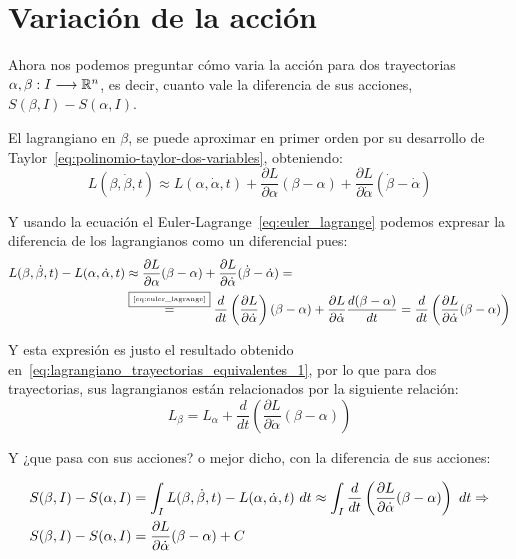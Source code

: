\section{Variación de la acción}
Ahora nos podemos preguntar cómo varia la acción para dos trayectorias $\alpha,\beta:I\longrightarrow \mathbb{R}^n$, es decir, cuanto vale la diferencia de sus acciones, $S(\beta, I)-S(\alpha, I)$.

El lagrangiano en $\beta$, se puede aproximar en primer orden por su desarrollo de Taylor~\ref{eq:polinomio-taylor-dos-variables}, obteniendo:
\begin{equation*}
    L(\beta, \dot{\beta}, t)\approx L(\alpha, \dot{\alpha}, t)+\frac{\partial L}{\partial\alpha}(\beta-\alpha)+\frac{\partial L}{\partial\dot{\alpha}}(\dot{\beta}-\dot{\alpha})
\end{equation*}

Y usando la ecuación el Euler-Lagrange~\ref{eq:euler_lagrange} podemos expresar la diferencia de los lagrangianos como un diferencial pues:
\begin{equation}
    \label{variacion-lagrange}
    \begin{align}
        L(\beta, \dot{\beta}, t)- L(\alpha, \dot{\alpha}, t) & \approx\frac{\partial L}{\partial\alpha}(\beta-\alpha)+\frac{\partial L}{\partial\dot{\alpha}}(\dot{\beta}-\dot{\alpha})=\\
        & \overset{\fbox{\tiny \ref{eq:euler_lagrange}}}{=}\frac{d}{dt}\left(\frac{\partial L}{\partial\dot{\alpha}}\right)(\beta-\alpha)+\frac{\partial L}{\partial\dot{\alpha}}\frac{d(\beta-\alpha)}{dt} =\frac{d}{dt}\left(\frac{\partial L}{\partial\dot{\alpha}}(\beta-\alpha)\right)
    \end{align}
\end{equation}

Y esta expresión es justo el resultado obtenido en~\ref{eq:lagrangiano_trayectorias_equivalentes_1}, por lo que para dos trayectorias, sus lagrangianos están relacionados por la siguiente relación:
\begin{equation}
    \label{eq:lagrangianos_relacionados}
    L_\beta=L_\alpha+\frac{d}{dt}\left(\frac{\partial L}{\partial\dot{\alpha}}(\beta-\alpha)\right)
\end{equation}

Y ¿que pasa con sus acciones? o mejor dicho, con la diferencia de sus acciones:

\begin{equation}
    \label{eq:variacion-accion}
    \begin{align}
        S(\beta, I)-S(\alpha, I) & = \int_I L(\beta, \dot{\beta}, t)- L(\alpha, \dot{\alpha}, t)\ dt\approx\int_I\frac{d}{dt}\left(\frac{\partial L}{\partial\dot{\alpha}}(\beta-\alpha)\right)\ dt\so \\
        S(\beta, I)-S(\alpha, I) & = \frac{\partial L}{\partial\dot{\alpha}}(\beta-\alpha)+C
    \end{align}
\end{equation}

